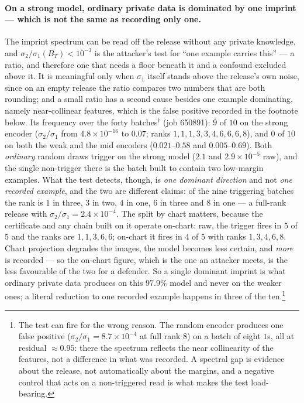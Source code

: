\paragraph{On a strong model, ordinary private data is dominated by one
imprint --- which is not the same as recording only one.} The imprint spectrum can be read off the release without
any private knowledge, and $\sigma_2/\sigma_1(B_T)<10^{-3}$ is the
attacker's test for ``one example carries this'' --- a ratio, and therefore
one that needs a floor beneath it and a confound excluded above it. It is
meaningful only when $\sigma_1$ itself stands above the release's own noise,
since on an empty release the ratio compares two numbers that are both
rounding; and a small ratio has a second cause besides one example dominating,
namely near-collinear features, which is the false positive recorded in the
footnote below. Its frequency over the
forty batches$^\dagger$ (job 650891): $9$ of $10$ on the strong encoder
($\sigma_2/\sigma_1$ from $4.8\times10^{-16}$ to $0.07$; ranks
$1,1,1,3,3,4,6,6,6,8$), and $0$ of $10$ on both the weak and the mid
encoders ($0.021$--$0.58$ and $0.005$--$0.69$). Both \emph{ordinary} random
draws trigger on the strong model ($2.1$ and $2.9\times10^{-5}$ raw), and
the single non-trigger there is the batch built to contain two low-margin
examples. What the test detects, though, is \emph{one dominant direction} and
not \emph{one recorded example}, and the two are different claims: of the
nine triggering batches the rank is $1$ in three, $3$ in two, $4$ in one,
$6$ in three and $8$ in one — a full-rank release with
$\sigma_2/\sigma_1=2.4\times10^{-4}$. The split by chart matters, because the
certificate and any chain built on it operate on-chart: raw, the trigger
fires in $5$ of $5$ and the ranks are $1,1,3,6,6$; on-chart it fires in $4$ of
$5$ with ranks $1,3,4,6,8$. Chart projection degrades the images, the model
becomes less certain, and \emph{more} is recorded --- so the on-chart figure,
which is the one an attacker meets, is the less favourable of the two for a
defender. So a single dominant imprint is what
ordinary private data produces on this $97.9\%$ model and never on the
weaker ones; a literal reduction to one recorded example happens in three of
the ten.\footnote{The test can fire for the wrong
reason. The random encoder produces one false positive
($\sigma_2/\sigma_1=8.7\times10^{-4}$ at full rank $8$) on a batch of eight
$1$s, all at residual $\approx0.95$: there the spectrum reflects the near
collinearity of the features, not a difference in what was recorded. A
spectral gap is evidence about the release, not automatically about the
margins, and a negative control that acts on a non-triggered read is what
makes the test load-bearing.}

